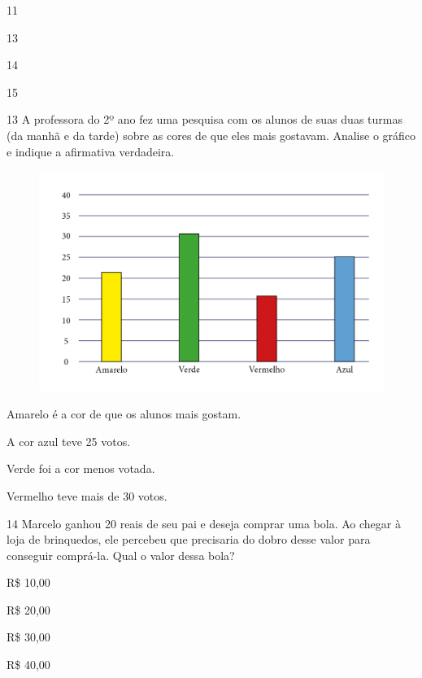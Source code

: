 \begin{escolha}
\item 11

\item 13

\item 14

\item 15
\end{escolha}

\num{13} A professora do 2º ano fez uma pesquisa com os alunos de suas duas
turmas (da manhã e da tarde) sobre as cores de que eles mais gostavam.
Analise o gráfico e indique a afirmativa verdadeira.

\begin{figure}[htpb!]
\includegraphics[width=\textwidth]{./media/image136.png}
\end{figure}

\begin{escolha}
\item Amarelo é a cor de que os alunos mais gostam.

\item A cor azul teve 25 votos.

\item Verde foi a cor menos votada.

\item Vermelho teve mais de 30 votos.
\end{escolha}

\num{14} Marcelo ganhou 20 reais de seu pai e deseja comprar uma bola. Ao chegar
à loja de brinquedos, ele percebeu que precisaria do dobro desse valor
para conseguir comprá-la. Qual o valor dessa bola?

\begin{escolha}
\item R\$ 10,00

\item R\$ 20,00

\item R\$ 30,00

\item R\$ 40,00
\end{escolha}

